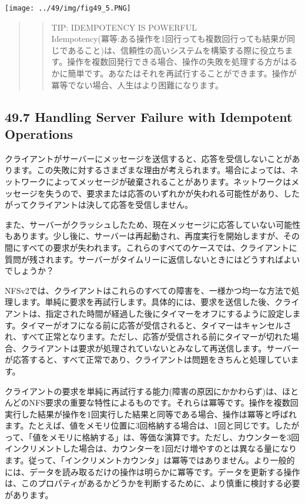 \texttt{[image: ../49/img/fig49\_5.PNG]}

\begin{quote}
\begin{quote}
TIP: IDEMPOTENCY IS POWERFUL\\
Idempotency(冪等:ある操作を1回行っても複数回行っても結果が同じであること)は、信頼性の高いシステムを構築する際に役立ちます。操作を複数回発行できる場合、操作の失敗を処理する方がはるかに簡単です。あなたはそれを再試行することができます。操作が冪等でない場合、人生はより困難になります。
\end{quote}
\end{quote}

\hypertarget{handling-server-failure-with-idempotent-operations}{%
\subsection*{49.7 Handling Server Failure with Idempotent
Operations}\label{handling-server-failure-with-idempotent-operations}}

クライアントがサーバーにメッセージを送信すると、応答を受信しないことがあります。この失敗に対するさまざまな理由が考えられます。場合によっては、ネットワークによってメッセージが破棄されることがあります。ネットワークはメッセージを失うので、要求または応答のいずれかが失われる可能性があり、したがってクライアントは決して応答を受信しません。

また、サーバーがクラッシュしたため、現在メッセージに応答していない可能性もあります。少し後に、サーバーは再起動され、再度実行を開始しますが、その間にすべての要求が失われます。これらのすべてのケースでは、クライアントに質問が残されます。サーバーがタイムリーに返信しないときにはどうすればよいでしょうか？

NFSv2では、クライアントはこれらのすべての障害を、一様かつ均一な方法で処理します。単純に要求を再試行します。具体的には、要求を送信した後、クライアントは、指定された時間が経過した後にタイマーをオフにするように設定します。タイマーがオフになる前に応答が受信されると、タイマーはキャンセルされ、すべて正常となります。ただし、応答が受信される前にタイマーが切れた場合、クライアントは要求が処理されていないとみなして再送信します。サーバーが応答すると、すべて正常であり、クライアントは問題をきちんと処理しています。

クライアントの要求を単純に再試行する能力(障害の原因にかかわらず)は、ほとんどのNFS要求の重要な特性によるものです。それらは冪等です。操作を複数回実行した結果が操作を1回実行した結果と同等である場合、操作は冪等と呼ばれます。たとえば、値をメモリ位置に3回格納する場合は、1回と同じです。したがって、「値をメモリに格納する」は、等価な演算です。ただし、カウンターを3回インクリメントした場合は、カウンターを1回だけ増やすのとは異なる量になります。従って、「インクリメントカウンタ」は冪等ではありません。より一般的には、データを読み取るだけの操作は明らかに冪等です。データを更新する操作は、このプロパティがあるかどうかを判断するために、より慎重に検討する必要があります。

